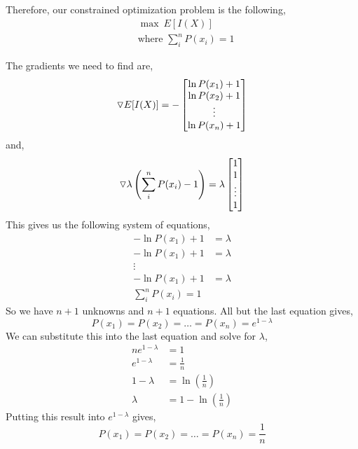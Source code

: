 \documentclass[12pt]{article}
\begin{document}
 Therefore, our constrained optimization problem is the following,
\begin{align*}
& \max\ E[I(X)] \\
& \mbox{where } \sum_{i}^{n} P(x_i) = 1
\end{align*}

 The gradients we need to find are,
\[
\triangledown E[I(X)] = 
-
\begin{bmatrix}
\ln P(x_1) + 1 \\
\ln P(x_2) + 1 \\
\vdots \\
\ln P(x_n)  + 1
\end{bmatrix}
\]
and,
\[
\triangledown \lambda \left( \sum_{i}^{n} P(x_i) -1 \right) = 
\lambda
\begin{bmatrix}
1 \\
1 \\
\vdots \\
1
\end{bmatrix}
\]
This gives us the following system of equations,
\begin{align*}
-\ln P(x_1) + 1 &= \lambda \\
-\ln P(x_1) + 1 &= \lambda \\
\vdots \\
-\ln P(x_1) + 1 &= \lambda \\
\sum_{i}^{n} P(x_i) = 1
\end{align*}
So we have $n+1$ unknowns and $n+1$ equations. All but the last equation gives,
\[
P(x_1) = P(x_2) = \ldots = P(x_n) = e^{1-\lambda}
\]
We can substitute this into the last equation and solve for $\lambda$,
\begin{align*}
ne^{1-\lambda} &= 1 \\
e^{1-\lambda} &= \frac{1}{n} \\
1-\lambda &= \ln \left(\frac{1}{n}\right) \\
\lambda &= 1 - \ln \left(\frac{1}{n} \right)
\end{align*}
Putting this result into $e^{1-\lambda}$ gives,
\[
P(x_1)=P(x_2)=\ldots=P(x_n)=\frac{1}{n}
\]
\end{document}
